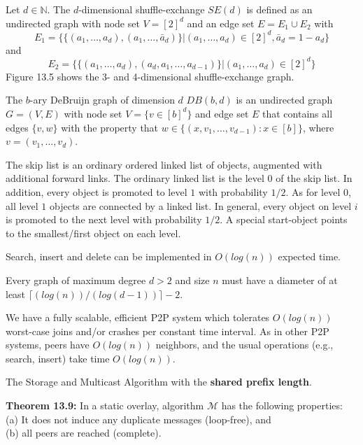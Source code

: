 {
	Let $d \in \mathbb{N}$. The $d$-dimensional shuffle-exchange $SE(d)$ 
	is defined as an undirected graph with node set $V = [2]^d$ and an edge set 
	$E = E_1 \cup E_2$ with 
	\[
		E_1 = \{\{(a_1,\ldots, a_d),(a_1,\ldots,\bar{a}_d)\}|(a_1,\ldots, a_d) \in [2]^d, \bar{a}_d = 1-a_d\}
	\]
	and
	\[
		E_2 = \{\{(a_1,\ldots, a_d),(a_d, a_1,\ldots,a_{d-1})\}|(a_1,\ldots, a_d) \in [2]^d\}
	\]
	Figure 13.5 shows the 3- and 4-dimensional shuffle-exchange graph.
}

{
	The $b$-ary DeBruijn graph of dimension $d$ $DB(b, d)$ is an undirected 
	graph $G=(V,E)$ with node set $V=\{v \in [b]^d\}$ and edge set $E$ that 
	contains all edges $\{v,w\}$ with the property that $w \in \{(x, v_1,\ldots, v_{d-1}):x \in [b]\}$, 
	where $v=(v_1,\ldots, v_d)$.
}

{
	The skip list is an ordinary ordered linked list of objects, augmented with 
	additional forward links. The ordinary linked list is the level $0$ of the 
	skip list. In addition, every object is promoted to level $1$ with probability 
	$1/2$. As for level $0$, all level $1$ objects are connected by a linked list. 
	In general, every object on level $i$ is promoted to the next level with 
	probability $1/2$. A special start-object points to the smallest/first object on each level.
	\begin{items}
		\item Search, insert and delete can be implemented in $O(log(n))$ expected time.
	\end{items}
}

{
	Every graph of maximum degree $d>2$ and size $n$ must have a diameter of at 
	least $\lceil(log(n))/(log(d-1))\rceil-2$.
}

{
	
}

{
	We have a fully scalable, efficient P2P system which tolerates $O(log(n))$ 
	worst-case joins and/or crashes per constant time interval. As in other P2P 
	systems, peers have $O(log(n))$ neighbors, and the usual operations 
	(e.g., search, insert) take time $O(log(n))$.
}

{
	\begin{items}
		\item The Storage and Multicast Algorithm with the {\bf shared prefix length}.
		\item {\bf Theorem 13.9:} In a static overlay, algorithm $\mathcal{M}$ has the following properties:\\
			(a) It does not induce any duplicate messages (loop-free), and\\
			(b) all peers are reached (complete).
	\end{items}
}

{
	
}
